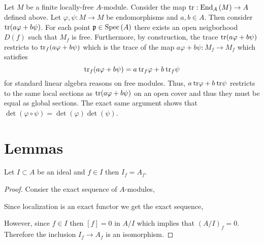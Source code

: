 \documentclass[12pt]{article}
\begin{document}
\subsection{}

Let $M$ be a finite locally-free $A$-module. Consider the map $\mathrm{tr} : \mathrm{End}_{A}\left(M\right) \to A$ defined above. Let $\varphi, \psi : M \to M$ be endomorphisms and $a, b \in A$. Then consider $\mathrm{tr}{(a \varphi + b \psi)}$. For each point $\mathfrak{p} \in \mathrm{Spec}\left( A \right)$ there exists an open neigborhood $D(f)$ such that $M_f$ is free. Furthermore, by construction, the trace $\mathrm{tr}{(a \varphi + b \psi)}$ restricts to $\mathrm{tr}_f(a \varphi + b \psi)$ which is the trace of the map $a \varphi + b \psi : M_f \to M_f$ which satisfies 
\[\mathrm{tr}_f(a \varphi + b \psi) = a \: \mathrm{tr}_f{\varphi} + b \: \mathrm{tr}_f{\psi} \]
for standard linear algebra reasons on free modules. Thus, $a\:  \mathrm{tr}{\varphi} + b \: \mathrm{tr}{\psi}$ restricts to the same local sections as $\mathrm{tr}{(a \varphi + b \psi)}$ on an open cover and thus they must be equal as global sections. The exact same argument shows that $\det{(\varphi \circ \psi)} = \det{(\varphi)} \det{(\psi)}$. 

\section{Lemmas}

\begin{lemma} \label{localize_ideal}
Let $I \subset A$ be an ideal and $f \in I$ then $I_f = A_f$.
\end{lemma}

\begin{proof}
Consier the exact sequence of $A$-modules,
\begin{center}
\end{center}
Since localization is an exact functor we get the exact sequence,
\begin{center}
\end{center}
However, since $f \in I$ then $[f] = 0$ in $A / I$ which implies that $(A / I)_f = 0$. Therefore the inclusion $I_f \to A_f$ is an isomorphism. 
\end{proof}
\end{document}
